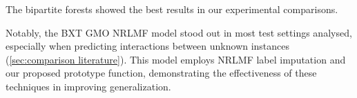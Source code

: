 \begin{enumerate}
    The bipartite forests showed the best results in our experimental comparisons.

    Notably, the BXT GMO NRLMF model stood out in most test settings analysed, especially when predicting interactions between unknown instances (\autoref{sec:comparison literature}). This model employs NRLMF label imputation and our proposed prototype function, demonstrating the effectiveness of these techniques in improving generalization.





\end{enumerate}

% 
% 


